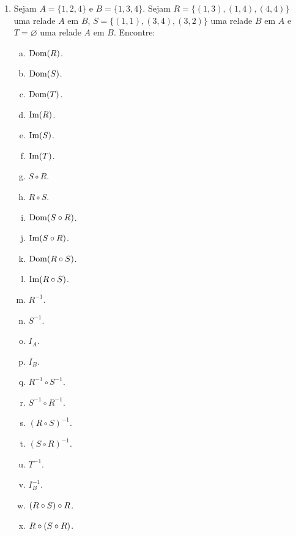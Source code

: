 \begin{enumerate}[{\bf 1.}]

\item Sejam $A=\{1,2,4\}$ e $B=\{1,3,4\}$. Sejam $R=\{(1,3),(1,4),(4,4)\}$ uma rela\cao de $A$ em $B$, $S=\{(1,1),(3,4),(3,2)\}$ uma rela\cao de $B$ em $A$ e $T=\varnothing$ uma rela\cao de $A$ em $B$. Encontre:
\begin{enumerate}[a)]
\item $\operatorname{Dom}(R)$.
\item $\operatorname{Dom}(S)$.
\item $\operatorname{Dom}(T)$.
\item $\operatorname{Im}(R)$.
\item $\operatorname{Im}(S)$.
\item $\operatorname{Im}(T)$.
\item $S\circ R$.
\item $R\circ S$.
\item $\operatorname{Dom}(S\circ R)$.
\item $\operatorname{Im}(S\circ R)$.
\item $\operatorname{Dom}(R\circ S)$.
\item $\operatorname{Im}(R\circ S)$.
\item $R^{-1}$.
\item $S^{-1}$.
\item $I_A$.
\item $I_B$.
\item $R^{-1}\circ S^{-1}$.
\item $S^{-1}\circ R^{-1}$.
\item $(R\circ S)^{-1}$.
\item $(S\circ R)^{-1}$.
\item $T^{-1}$.
\item $I_B^{-1}$.
\item $(R\circ S)\circ R$.
\item $R\circ(S\circ R)$. 
\end{enumerate}


\end{enumerate}
